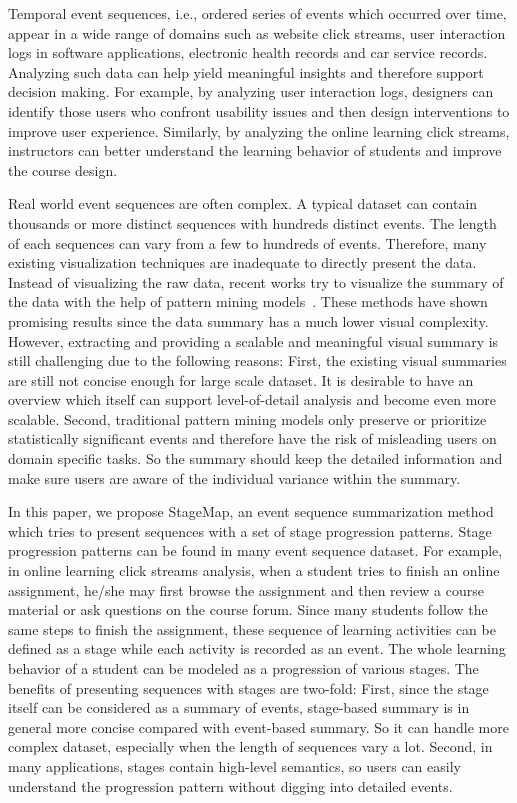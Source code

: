 
Temporal event sequences, i.e., ordered series of events which occurred over time, appear in a wide range of domains such as website click streams, user interaction logs in software applications, electronic health records and car service records. Analyzing such data can help yield meaningful insights and therefore support decision making. For example, by analyzing user interaction logs, designers can identify those users who confront usability issues and then design interventions to improve user experience. Similarly, by analyzing the online learning click streams, instructors can better understand the learning behavior of students and improve the course design.  

Real world event sequences are often complex. A typical dataset can contain thousands or more distinct sequences with hundreds distinct events. The length of each sequences can vary from a few to hundreds of events. Therefore, many existing visualization techniques are inadequate to directly present the data. Instead of visualizing the raw data, recent works try to visualize the summary of the data with the help of pattern mining models~\cite{stasko2000focus+,polack2015timestitch,perer2014frequence,kwon2016peekquence,liu2017patterns,wang2016unsupervised,liu2017coreflow,guo2018eventthread}. These methods have shown promising results since the data summary has a much lower visual complexity. However, extracting and providing a scalable and meaningful visual summary is still challenging due to the following reasons: First, the existing visual summaries are still not concise enough for large scale dataset. It is desirable to have an overview which itself can support level-of-detail analysis and become even more scalable. Second, traditional pattern mining models only preserve or prioritize statistically significant events and therefore have the risk of misleading users on domain specific tasks. So the summary should keep the detailed information and make sure users are aware of the individual variance within the summary. 

In this paper, we propose StageMap, an event sequence summarization method which tries to present sequences with a set of stage progression patterns. Stage progression patterns can be found in many event sequence dataset. For example, in online learning click streams analysis, when a student tries to finish an online assignment, he/she may first browse the assignment and then review a course material or ask questions on the course forum. Since many students follow the same steps to finish the assignment, these sequence of learning activities can be defined as a stage while each activity is recorded as an event. The whole learning behavior of a student can be modeled as a progression of various stages. The benefits of presenting sequences with stages are two-fold: First, since the stage itself can be considered as a summary of events, stage-based summary is in general more concise compared with event-based summary. So it can handle more complex dataset, especially when the length of sequences vary a lot. Second, in many applications, stages contain high-level semantics, so users can easily understand the progression pattern without digging into detailed events.  

